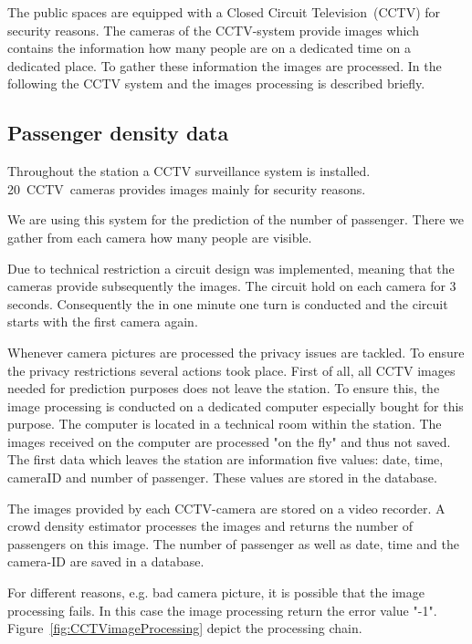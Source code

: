 The public spaces are equipped with a Closed Circuit Television~(CCTV) for security reasons. The cameras of the CCTV-system provide images which contains the information how many people are on a dedicated time on a dedicated place. To gather these information the images are processed. In the following the CCTV system and the  images processing is described briefly.


\subsection{Passenger density data}
\label{subsec:PassengerDensityData}

Throughout the station a CCTV surveillance system is installed. 20~CCTV~cameras provides images mainly for security reasons.

We are using this system for the prediction of the number of passenger. There we gather from each camera how many people are visible.

Due to technical restriction a circuit design was implemented, meaning that the cameras provide subsequently the images. The circuit hold on each camera for 3  seconds. Consequently the in one minute one turn is conducted and the circuit starts with the first camera again.

Whenever camera pictures are processed the privacy issues are tackled. To ensure the privacy restrictions several actions took place.
First of all, all CCTV images needed for prediction purposes does not leave the station. To ensure this, the image processing is conducted on a dedicated computer especially bought for this purpose. The computer is located in a technical room within the station.
The images received on the computer are processed "on the fly" and thus not saved.
The first data which leaves the station are information five values: date, time, cameraID and number of passenger. These values are stored in the database.

 The images provided by each CCTV-camera are stored on a video recorder. A crowd density estimator processes the images and returns the number of passengers on this image. The number of passenger as well as date, time and the camera-ID are saved in a database.

For different reasons, e.g. bad camera picture, it is possible that the image processing fails. In this case the image processing return the error value "-1".
Figure~\ref{fig:CCTVimageProcessing} depict the processing chain.

